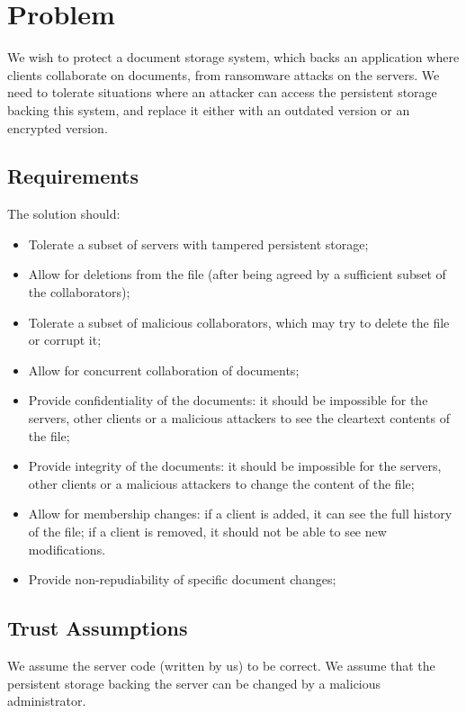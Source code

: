 \section{Problem}

We wish to protect a document storage system, which backs an
application where clients collaborate on documents, from
ransomware attacks on the servers. We need to tolerate situations
where an attacker can access the persistent storage backing this
system, and replace it either with an outdated version or an
encrypted version.

\subsection{Requirements}
The solution should:
\begin{itemize}
    \setlength{\itemsep}{0pt}
    \setlength{\parskip}{0pt}
    \setlength{\parsep}{0pt}
    \item Tolerate a subset of servers with tampered
        persistent storage;
    \item Allow for deletions from the file (after being
        agreed by a sufficient subset of the collaborators);
    \item Tolerate a subset of malicious collaborators, which
        may try to delete the file or corrupt it;
    \item Allow for concurrent collaboration of documents;
    \item Provide confidentiality of the documents: it should
        be impossible for the servers, other clients or a
        malicious attackers to see the cleartext contents of
        the file;
    \item Provide integrity of the documents: it should
        be impossible for the servers, other clients or a
        malicious attackers to change the content of
        the file;
    \item Allow for membership changes: if a client is added,
        it can see the full history of the file; if a client
        is removed, it should not be able to see new
        modifications.
    \item Provide non-repudiability of specific document changes;
\end{itemize}

\subsection{Trust Assumptions}
We assume the server code (written by us) to be correct. We
assume that the persistent storage backing the server can be
changed by a malicious administrator.

